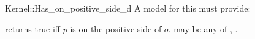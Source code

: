 \begin{ccRefFunctionObjectConcept}{Kernel::Has_on_positive_side_d}
A model for this must provide:


{returns true iff $p$ is on the positive side of $o$. 
 may be any of , 
.}

\end{ccRefFunctionObjectConcept}
